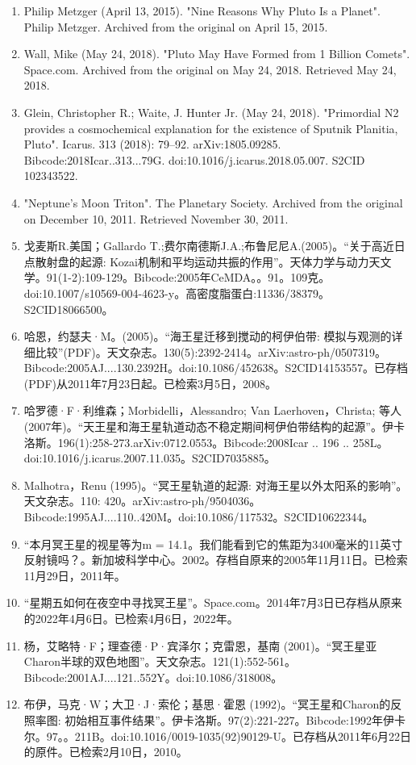 \begin{enumerate}
\item Philip Metzger (April 13, 2015). "Nine Reasons Why Pluto Is a Planet". Philip Metzger. Archived from the original on April 15, 2015.
\item Wall, Mike (May 24, 2018). "Pluto May Have Formed from 1 Billion Comets". Space.com. Archived from the original on May 24, 2018. Retrieved May 24, 2018.
\item Glein, Christopher R.; Waite, J. Hunter Jr. (May 24, 2018). "Primordial N2 provides a cosmochemical explanation for the existence of Sputnik Planitia, Pluto". Icarus. 313 (2018): 79–92. arXiv:1805.09285. Bibcode:2018Icar..313...79G. doi:10.1016/j.icarus.2018.05.007. S2CID 102343522.
\item "Neptune's Moon Triton". The Planetary Society. Archived from the original on December 10, 2011. Retrieved November 30, 2011.
\item 戈麦斯R.美国；Gallardo T.;费尔南德斯J.A.;布鲁尼尼A.(2005)。“关于高近日点散射盘的起源: Kozai机制和平均运动共振的作用”。天体力学与动力天文学。91(1-2):109-129。Bibcode:2005年CeMDA。。91。109克。doi:10.1007/s10569-004-4623-y。高密度脂蛋白:11336/38379。S2CID18066500。  
\item 哈恩，约瑟夫·M。(2005)。“海王星迁移到搅动的柯伊伯带: 模拟与观测的详细比较”(PDF)。天文杂志。130(5):2392-2414。arXiv:astro-ph/0507319。Bibcode:2005AJ....130.2392H。doi:10.1086/452638。S2CID14153557。已存档(PDF)从2011年7月23日起。已检索3月5日，2008。  
\item 哈罗德·F·利维森；Morbidelli，Alessandro; Van Laerhoven，Christa; 等人 (2007年)。“天王星和海王星轨道动态不稳定期间柯伊伯带结构的起源”。伊卡洛斯。196(1):258-273.arXiv:0712.0553。Bibcode:2008Icar .. 196 .. 258L。doi:10.1016/j.icarus.2007.11.035。S2CID7035885。 
\item Malhotra，Renu (1995)。“冥王星轨道的起源: 对海王星以外太阳系的影响”。天文杂志。110: 420。arXiv:astro-ph/9504036。Bibcode:1995AJ....110..420M。doi:10.1086/117532。S2CID10622344。 
\item “本月冥王星的视星等为m = 14.1。我们能看到它的焦距为3400毫米的11英寸反射镜吗？。新加坡科学中心。2002。存档自原来的2005年11月11日。已检索11月29日，2011年。
\item “星期五如何在夜空中寻找冥王星”。Space.com。2014年7月3日已存档从原来的2022年4月6日。已检索4月6日，2022年。
\item 杨，艾略特·F；理查德·P·宾泽尔；克雷恩，基南 (2001)。“冥王星亚Charon半球的双色地图”。天文杂志。121(1):552-561。Bibcode:2001AJ....121..552Y。doi:10.1086/318008。
\item 布伊，马克·W；大卫·J·索伦；基思·霍恩 (1992)。“冥王星和Charon的反照率图: 初始相互事件结果”。伊卡洛斯。97(2):221-227。Bibcode:1992年伊卡尔。97。。211B。doi:10.1016/0019-1035(92)90129-U。已存档从2011年6月22日的原件。已检索2月10日，2010。

\end{enumerate}
